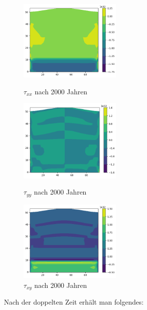 \documentclass[12pt]{article}
\begin{document}
\begin{figure}[H]
	\begin{minipage}[hbt]{0.25\textwidth}
		\centering
		\includegraphics[width=5cm]{A2_tauxx_2000.png}
		\caption{$\tau_{xx}$ nach 2000 Jahren}
		\label{Bild1}
	\end{minipage}
	\hfill
	\begin{minipage}[hbt]{0.25\textwidth}
		\centering
		\includegraphics[width=5cm]{A2_tauyy_2000.png}
		\caption{$\tau_{yy}$ nach 2000 Jahren}
		\label{Bild2}
	\end{minipage}
	\hfill
	\begin{minipage}[hbt]{0.25\textwidth}
		\centering
		\includegraphics[width=5cm]{A2_tauxy_2000.png}
		\caption{$\tau_{xy}$ nach 2000 Jahren}
		\label{Bild2}
	\end{minipage}
\end{figure}

Nach der doppelten Zeit erhält man folgendes:
\end{document}
